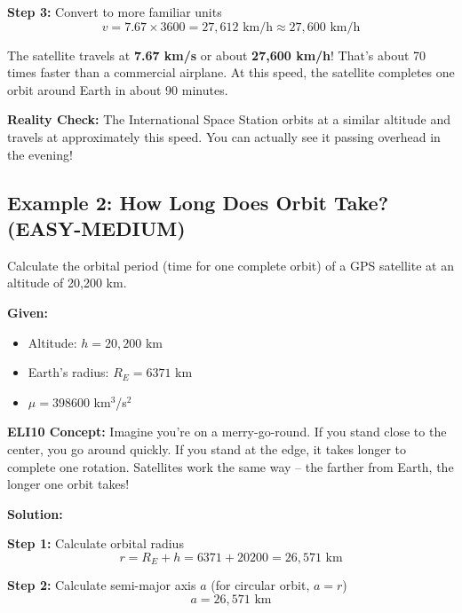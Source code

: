 \documentclass[11pt,a4paper]{article}
\begin{document}
\textbf{Step 3:} Convert to more familiar units
\begin{equation}
v = 7.67 \times 3600 = 27,612 \text{ km/h} \approx 27,600 \text{ km/h}
\end{equation}

\begin{tcolorbox}[colback=blue!5!white,colframe=blue!60!black,title=Answer]
The satellite travels at \textbf{7.67 km/s} or about \textbf{27,600 km/h}! That's about 70 times faster than a commercial airplane. At this speed, the satellite completes one orbit around Earth in about 90 minutes.

\textbf{Reality Check:} The International Space Station orbits at a similar altitude and travels at approximately this speed. You can actually see it passing overhead in the evening!
\end{tcolorbox}

\subsection{Example 2: How Long Does Orbit Take? (EASY-MEDIUM)}

\begin{tcolorbox}[colback=green!5!white,colframe=green!60!black,title=Problem]
Calculate the orbital period (time for one complete orbit) of a GPS satellite at an altitude of 20,200 km.

\textbf{Given:}
\begin{itemize}[nosep]
    \item Altitude: $h = 20,200$ km
    \item Earth's radius: $R_E = 6371$ km
    \item $\mu = 398600$ km$^3$/s$^2$
\end{itemize}
\end{tcolorbox}

\textbf{ELI10 Concept:} Imagine you're on a merry-go-round. If you stand close to the center, you go around quickly. If you stand at the edge, it takes longer to complete one rotation. Satellites work the same way -- the farther from Earth, the longer one orbit takes!

\textbf{Solution:}

\textbf{Step 1:} Calculate orbital radius
\begin{equation}
r = R_E + h = 6371 + 20200 = 26,571 \text{ km}
\end{equation}

\textbf{Step 2:} Calculate semi-major axis $a$ (for circular orbit, $a = r$)
\begin{equation}
a = 26,571 \text{ km}
\end{equation}
\end{document}

